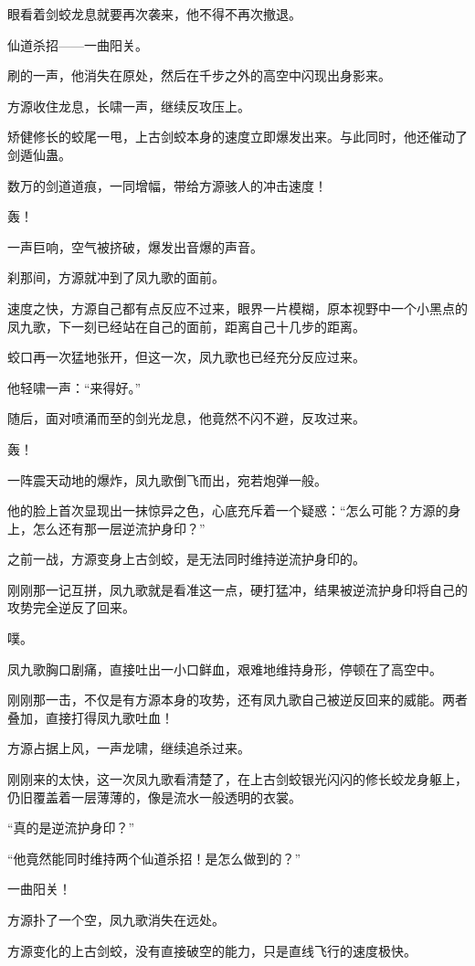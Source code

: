 \begin{this_body}
眼看着剑蛟龙息就要再次袭来，他不得不再次撤退。

仙道杀招——一曲阳关。

刷的一声，他消失在原处，然后在千步之外的高空中闪现出身影来。

方源收住龙息，长啸一声，继续反攻压上。

矫健修长的蛟尾一甩，上古剑蛟本身的速度立即爆发出来。与此同时，他还催动了剑遁仙蛊。

数万的剑道道痕，一同增幅，带给方源骇人的冲击速度！

轰！

一声巨响，空气被挤破，爆发出音爆的声音。

刹那间，方源就冲到了凤九歌的面前。

速度之快，方源自己都有点反应不过来，眼界一片模糊，原本视野中一个小黑点的凤九歌，下一刻已经站在自己的面前，距离自己十几步的距离。

蛟口再一次猛地张开，但这一次，凤九歌也已经充分反应过来。

他轻啸一声：“来得好。”

随后，面对喷涌而至的剑光龙息，他竟然不闪不避，反攻过来。

轰！

一阵震天动地的爆炸，凤九歌倒飞而出，宛若炮弹一般。

他的脸上首次显现出一抹惊异之色，心底充斥着一个疑惑：“怎么可能？方源的身上，怎么还有那一层逆流护身印？”

之前一战，方源变身上古剑蛟，是无法同时维持逆流护身印的。

刚刚那一记互拼，凤九歌就是看准这一点，硬打猛冲，结果被逆流护身印将自己的攻势完全逆反了回来。

噗。

凤九歌胸口剧痛，直接吐出一小口鲜血，艰难地维持身形，停顿在了高空中。

刚刚那一击，不仅是有方源本身的攻势，还有凤九歌自己被逆反回来的威能。两者叠加，直接打得凤九歌吐血！

方源占据上风，一声龙啸，继续追杀过来。

刚刚来的太快，这一次凤九歌看清楚了，在上古剑蛟银光闪闪的修长蛟龙身躯上，仍旧覆盖着一层薄薄的，像是流水一般透明的衣裳。

“真的是逆流护身印？”

“他竟然能同时维持两个仙道杀招！是怎么做到的？”

一曲阳关！

方源扑了一个空，凤九歌消失在远处。

方源变化的上古剑蛟，没有直接破空的能力，只是直线飞行的速度极快。


\end{this_body}
